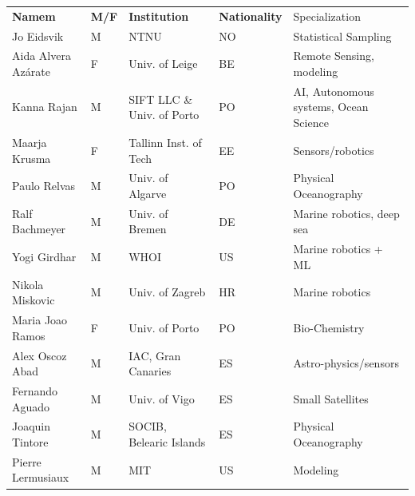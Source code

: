 \begin{table}[H]
  \footnotesize{
\begin{tabular}{|p{3cm}|p{0.5cm}|p{3.5cm}|p{0.5cm}|p{6cm}|}
  \rowcolor{Gray}
  \bfseries Namem& \bfseries M/F&\bfseries Institution & \bfseries Nationality& Specialization\\
Jo Eidsvik               & M   & NTNU                                  & NO       & Statistical Sampling                            \\
\hline
Aida Alvera Az\'{a}rate    & F   & Univ. of Leige                        & BE       & Remote Sensing, modeling                        \\
\hline
Kanna Rajan              & M   & SIFT LLC \& Univ. of Porto            & PO       & AI, Autonomous systems, Ocean Science           \\
 \hline
Maarja Krusma            & F   & Tallinn Inst. of Tech                 & EE  & Sensors/robotics                                \\
  \hline
Paulo Relvas             & M   & Univ. of Algarve                      & PO       & Physical Oceanography                           \\
\hline
Ralf Bachmeyer           & M   & Univ. of Bremen                       & DE       & Marine robotics, deep sea                       \\
\hline
Yogi Girdhar             & M   & WHOI                                  & US       & Marine robotics + ML                            \\
\hline
Nikola Miskovic          & M   & Univ. of Zagreb                       & HR  & Marine robotics                                 \\
\hline
Maria Joao Ramos         & F   & Univ. of Porto                        & PO       & Bio-Chemistry                                   \\
\hline
Alex Oscoz Abad          & M   & IAC, Gran Canaries                    & ES       & Astro-physics/sensors                           \\
\hline
Fernando Aguado          & M   & Univ. of Vigo                         & ES       & Small Satellites                                \\
\hline
Joaquin Tintore          & M   & SOCIB, Belearic Islands               & ES       & Physical Oceanography                           \\
\hline
Pierre Lermusiaux        & M   & MIT                                   & US       & Modeling                                        \\

\end{tabular}}
\end{table}
